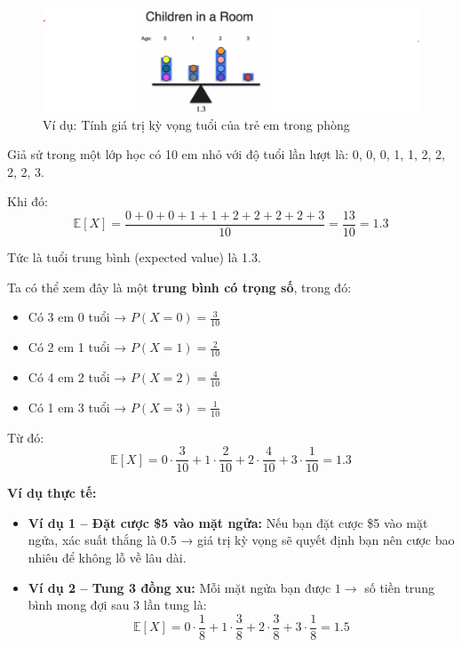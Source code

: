 \documentclass[11pt]{article}
\begin{document}
\begin{figure}[H]
    \centering %
    \includegraphics[width=1.2\linewidth]{images/expected_value_equilibrium.png}
    \caption{Ví dụ: Tính giá trị kỳ vọng tuổi của trẻ em trong phòng}
\end{figure}



Giả sử trong một lớp học có 10 em nhỏ với độ tuổi lần lượt là: 0, 0, 0, 1, 1, 2, 2, 2, 2, 3.

Khi đó:
\[
\mathbb{E}[X] = \frac{0 + 0 + 0 + 1 + 1 + 2 + 2 + 2 + 2 + 3}{10} = \frac{13}{10} = 1.3
\]

Tức là tuổi trung bình (expected value) là 1.3.

Ta có thể xem đây là một \textbf{trung bình có trọng số}, trong đó:
\begin{itemize}
    \item Có 3 em 0 tuổi → $P(X=0) = \frac{3}{10}$
    \item Có 2 em 1 tuổi → $P(X=1) = \frac{2}{10}$
    \item Có 4 em 2 tuổi → $P(X=2) = \frac{4}{10}$
    \item Có 1 em 3 tuổi → $P(X=3) = \frac{1}{10}$
\end{itemize}

Từ đó:
\[
\mathbb{E}[X] = 0 \cdot \frac{3}{10} + 1 \cdot \frac{2}{10} + 2 \cdot \frac{4}{10} + 3 \cdot \frac{1}{10} = 1.3
\]

\vspace{1em}

\textbf{Ví dụ thực tế:}
\begin{itemize}
    \item \textbf{Ví dụ 1 – Đặt cược \$5 vào mặt ngửa:} Nếu bạn đặt cược \$5 vào mặt ngửa, xác suất thắng là 0.5 → giá trị kỳ vọng sẽ quyết định bạn nên cược bao nhiêu để không lỗ về lâu dài.
    
    \item \textbf{Ví dụ 2 – Tung 3 đồng xu:} Mỗi mặt ngửa bạn được $1 →$ số tiền trung bình mong đợi sau 3 lần tung là:
    \[
    \mathbb{E}[X] = 0 \cdot \frac{1}{8} + 1 \cdot \frac{3}{8} + 2 \cdot \frac{3}{8} + 3 \cdot \frac{1}{8} = 1.5
    \]
\end{itemize}
\end{document}
